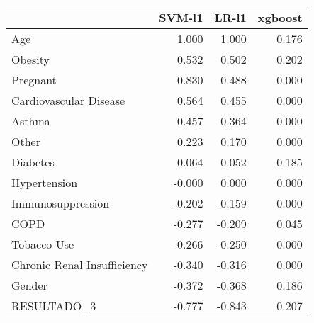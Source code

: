 \begin{tabular}{lrrr}
\toprule
{} &  SVM-l1 &  LR-l1 &  xgboost \\
\midrule
Age                         &   1.000 &  1.000 &    0.176 \\
Obesity                     &   0.532 &  0.502 &    0.202 \\
Pregnant                    &   0.830 &  0.488 &    0.000 \\
Cardiovascular Disease      &   0.564 &  0.455 &    0.000 \\
Asthma                      &   0.457 &  0.364 &    0.000 \\
Other                       &   0.223 &  0.170 &    0.000 \\
Diabetes                    &   0.064 &  0.052 &    0.185 \\
Hypertension                &  -0.000 &  0.000 &    0.000 \\
Immunosuppression           &  -0.202 & -0.159 &    0.000 \\
COPD                        &  -0.277 & -0.209 &    0.045 \\
Tobacco Use                 &  -0.266 & -0.250 &    0.000 \\
Chronic Renal Insufficiency &  -0.340 & -0.316 &    0.000 \\
Gender                      &  -0.372 & -0.368 &    0.186 \\
RESULTADO\_3                 &  -0.777 & -0.843 &    0.207 \\
\bottomrule
\end{tabular}
